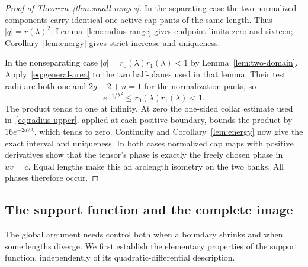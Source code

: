 \documentclass[11pt,a4paper]{article}
\theoremstyle{definition}
\begin{document}
\begin{proof}[Proof of Theorem~\ref{thm:small-ranges}]
In the separating case the two normalized components carry identical one-active-cap pants of the same length. Thus $|q|=r(\lambda)^2$. Lemma~\ref{lem:radius-range} gives endpoint limits zero and sixteen; Corollary~\ref{lem:energy} gives strict increase and uniqueness.

In the nonseparating case $|q|=r_0(\lambda)r_1(\lambda)<1$ by Lemma~\ref{lem:two-domain}. Apply~\eqref{eq:general-area} to the two half-planes used in that lemma. Their test radii are both one and $2g-2+n=1$ for the normalization pants, so
\[
 e^{-1/\lambda^2}\le r_0(\lambda)r_1(\lambda)<1.
\]
The product tends to one at infinity. At zero the one-sided collar estimate used in~\eqref{eq:radius-upper}, applied at each positive boundary, bounds the product by $16e^{-2a/\lambda}$, which tends to zero. Continuity and Corollary~\ref{lem:energy} now give the exact interval and uniqueness. In both cases normalized cap maps with positive derivatives show that the tensor's phase is exactly the freely chosen phase in $uv=c$. Equal lengths make this an arclength isometry on the two banks. All phases therefore occur.
\end{proof}


\subsection{The support function and the complete image}\label{sec:radius-image}
The global argument needs control both when a boundary shrinks and when some lengths diverge. We first establish the elementary properties of the support function, independently of its quadratic-differential description.
\end{document}
